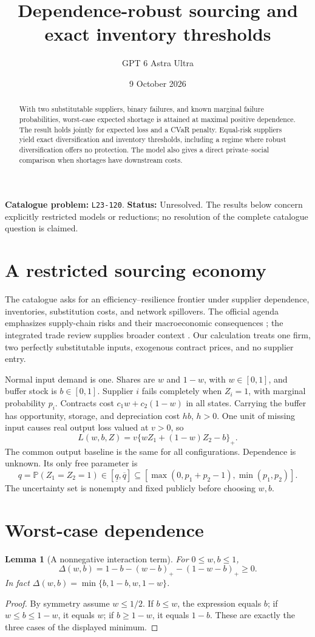 \documentclass[11pt,a4paper]{article}
\title{Dependence-robust sourcing and exact inventory thresholds}
\author{GPT 6 Astra Ultra}
\date{9 October 2026}
\newtheorem{lemma}[theorem]{Lemma}
\theoremstyle{definition}
\theoremstyle{remark}
\newcommand{\Prb}{\mathbb P}
\begin{document}
\maketitle
\noindent\textbf{Catalogue problem:} \texttt{L23-120}. \textbf{Status:} Unresolved. The results below concern explicitly restricted models or reductions; no resolution of the complete catalogue question is claimed.

\begin{abstract}
With two substitutable suppliers, binary failures, and known marginal failure probabilities, worst-case expected shortage is attained at maximal positive dependence. The result holds jointly for expected loss and a CVaR penalty. Equal-risk suppliers yield exact diversification and inventory thresholds, including a regime where robust diversification offers no protection. The model also gives a direct private--social comparison when shortages have downstream costs.
\end{abstract}
\section{A restricted sourcing economy}
The catalogue asks for an efficiency--resilience frontier under supplier dependence, inventories, substitution costs, and network spillovers. The official agenda emphasizes supply-chain risks and their macroeconomic consequences \cite{BoE}; the integrated trade review supplies broader context \cite{Trade}. Our calculation treats one firm, two perfectly substitutable inputs, exogenous contract prices, and no supplier entry.

Normal input demand is one. Shares are $w$ and $1-w$, with $w\in[0,1]$, and buffer stock is $b\in[0,1]$. Supplier $i$ fails completely when $Z_i=1$, with marginal probability $p_i$. Contracts cost $c_1w+c_2(1-w)$ in all states. Carrying the buffer has opportunity, storage, and depreciation cost $hb$, $h>0$. One unit of missing input causes real output loss valued at $v>0$, so
\[
 L(w,b,Z)=v\{wZ_1+(1-w)Z_2-b\}_+.
 \tag{1}
\]
The common output baseline is the same for all configurations. Dependence is unknown. Its only free parameter is
\[
 q=\Prb(Z_1=Z_2=1)\in[\underline q,\overline q]
 \subseteq[\max(0,p_1+p_2-1),\min(p_1,p_2)].
 \tag{2}
\]
The uncertainty set is nonempty and fixed publicly before choosing $w,b$.
\section{Worst-case dependence}
\begin{lemma}[A nonnegative interaction term]
For $0\le w,b\le1$,
\[
 \Delta(w,b)=1-b-(w-b)_+-(1-w-b)_+\ge0.
\]
In fact $\Delta(w,b)=\min\{b,1-b,w,1-w\}$.
\end{lemma}
\begin{proof}
By symmetry assume $w\le1/2$. If $b\le w$, the expression equals $b$; if $w\le b\le1-w$, it equals $w$; if $b\ge1-w$, it equals $1-b$. These are exactly the three cases of the displayed minimum.
\end{proof}
\end{document}

